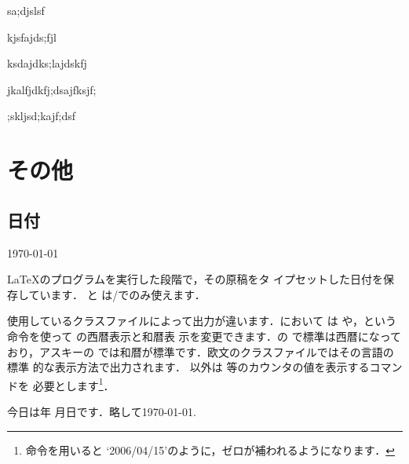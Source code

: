\begin{dangerous}
\item sa;djslsf 
\item kjsfajds;fjl
\end{dangerous}

\begin{FRAME}
 ksdajdks;lajdskfj
\end{FRAME}

\begin{screen}
jkalfjdkfj;dsajfksjf;
 
\end{screen}

\begin{EXAMPLE}
;skljsd;kajf;dsf 
\end{EXAMPLE}

\section{その他}

\subsection{日付}

\begin{usage}
\today
{} 
\year
\month
\day
\end{usage}

{\LaTeX}のプログラムを実行した段階で，その原稿をタ
イプセットした日付を保存しています． と 
は/でのみ使えます．

%
%
使用しているクラスファイルによって出力が違います．において
は や，という命令を使って  の西暦表示と和暦表
示を変更できます．の
で標準は西暦になっており，アスキーの
では和暦が標準です．欧文のクラスファイルではその言語の標準
的な表示方法で出力されます．
 以外は  等のカウンタの値を表示するコマンドを
必要とします\footnote{ 命令を用いると
`2006/04/15'のように，ゼロが補われるようになります．}．
\begin{inout}
今日は\number\year 年\number\month
月\number\day 日です．略して\today.
\end{inout}

